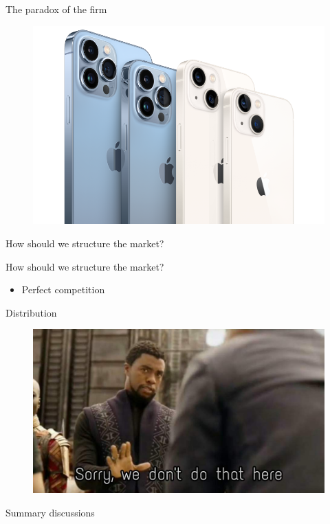 \documentclass{beamer}
\begin{document}
\begin{frame}{The paradox of the firm}

	\begin{figure}[htpb]
		\centering
		\includegraphics[width=0.8\linewidth]{../img/iphone.png}
	\end{figure}

\end{frame}

\begin{frame}{How should we structure the market?}
\end{frame}

\begin{frame}{How should we structure the market?}
    \begin{itemize}
    \item Perfect competition
    \end{itemize}
\end{frame}{}

\begin{frame}{Distribution}
	\begin{figure}[htpb]
		\centering
		\includegraphics[width=0.8\linewidth]{../img/dontdoit.jpeg}
	\end{figure}
\end{frame}{}

\begin{frame}{Summary discussions}
\end{frame}
\end{document}
